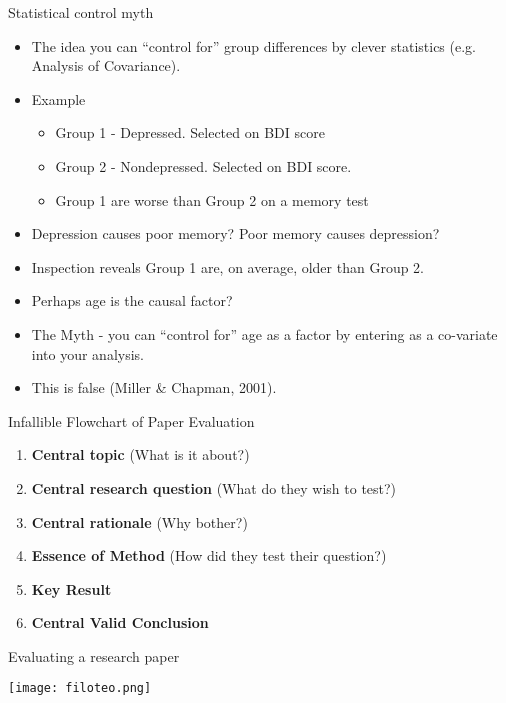 \documentclass{beamer}
\begin{document}
\begin{frame}{Statistical control myth}
\begin{itemize}
\item The idea you can ``control for'' group differences by clever statistics (e.g. Analysis of Covariance).
\item Example
\begin{itemize}
\item Group 1 - Depressed. Selected on BDI score
\item Group 2 - Nondepressed. Selected on BDI score.
\item Group 1 are worse than Group 2 on a memory test
\end{itemize}
\item Depression causes poor memory? Poor memory causes depression?
\item Inspection reveals Group 1 are, on average, older than Group 2. 
\item Perhaps age is the causal factor?
\item The Myth - you can ``control for'' age as a factor by entering as a co-variate into your analysis.
\item This is false (Miller \& Chapman, 2001). 
\end{itemize}
\end{frame}


\begin{frame}{Infallible Flowchart of Paper Evaluation}
\begin{enumerate}
\item \textbf{Central topic} (What is it about?)
\item \textbf{Central research question} (What do they wish to test?)
\item \textbf{Central rationale} (Why bother?)
\item \textbf{Essence of Method} (How did they test their question?)
\item \textbf{Key Result}
\item \textbf{Central Valid Conclusion}
\end{enumerate}
\end{frame}



\begin{frame}{Evaluating a research paper}

\centerline{\texttt{[image: filoteo.png]}}

\end{frame}
\end{document}
